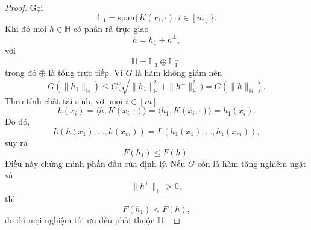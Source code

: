 \begin{proof}
Gọi
\begin{equation}
\mathbb{H}_1
=
\mathrm{span}\{K(x_i,\cdot)\colon i \in [m]\}.
\end{equation}
Khi đó mọi $h \in \mathbb{H}$ có phân rã trực giao
\begin{equation}
h = h_1 + h^\perp,
\end{equation}
với
\begin{equation}
\mathbb{H}
=
\mathbb{H}_1 \oplus \mathbb{H}_1^\perp.
\end{equation}
trong đó $\oplus$ là tổng trực tiếp.
Vì $G$ là hàm không giảm nên
\begin{equation}
G(\|h_1\|_{\mathbb{H}})
\le
G\Biggl(
\sqrt{
\|h_1\|_{\mathbb{H}}^2
+
\|h^\perp\|_{\mathbb{H}}^2
}
\Biggr)
=
G(\|h\|_{\mathbb{H}}).
\end{equation}
Theo tính chất tái sinh, với mọi $i \in [m]$,
\begin{equation}
h(x_i)
=
\langle h, K(x_i,\cdot)\rangle
=
\langle h_1, K(x_i,\cdot)\rangle
=
h_1(x_i).
\end{equation}
Do đó,
\begin{equation}
L(h(x_1),\ldots,h(x_m))
=
L(h_1(x_1),\ldots,h_1(x_m)),
\end{equation}
suy ra
\begin{equation}
F(h_1) \le F(h).
\end{equation}
Điều này chứng minh phần đầu của định lý.
Nếu $G$ còn là hàm tăng nghiêm ngặt và
\begin{equation}
\|h^\perp\|_{\mathbb{H}} > 0,
\end{equation}
thì
\begin{equation}
F(h_1) < F(h),
\end{equation}
do đó mọi nghiệm tối ưu đều phải thuộc
$\mathbb{H}_1$.

\end{proof}